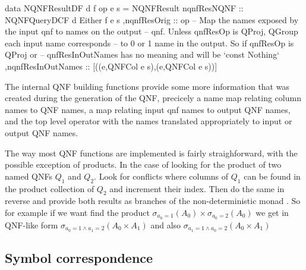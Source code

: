 \begin{code}
  \begin{haskellcode}
    data NQNFResultDF d f op e s =
    NQNFResult
    { nqnfResNQNF :: NQNFQueryDCF d Either f e s
      ,nqnfResOrig :: op
      -- Map the names exposed by the input qnf to names on the output
      -- qnf. Unless qnfResOp is QProj, QGroup each input name corresponds
      -- to 0 or 1 name in the output. So if qnfResOp is QProj or
      -- qnfResInOutNames has no meaning and will be `const Nothing`
      ,nqnfResInOutNames :: [((e,QNFCol e s),(e,QNFCol e s))]
    }
  \end{haskellcode}
  \caption{\label{lst:qnf_result}The internal QNF building functions
    provide some more information that was created during the
    generation of the QNF, precicely a name map relating column names
    to QNF names, a map relating input qnf names to output QNF names,
    and the top level operator with the names translated appropriately
    to input or output QNF names.}
\end{code}

The way most QNF functions are implemented is fairly straighforward,
with the possible exception of products. In the case of looking for
the product of two named QNFs \(Q_1\) and \(Q_2\).  Look for conflicts
where columns of \(Q_1\) can be found in the product collection of
\(Q_2\) and increment their index. Then do the same in reverse and
provide both results as branches of the non-deterministic monad
. So for example if we want find the product
\(\sigma_{a_0=1}(A_0) \times \sigma_{a_0=2}(A_0)\) we get in QNF-like
form \(\sigma_{a_0=1 \land a_1=2} (A_0 \times A_1)\) and also
\(\sigma_{a_1=1 \land a_0=2} (A_0 \times A_1)\)


\subsection{Symbol correspondence}

